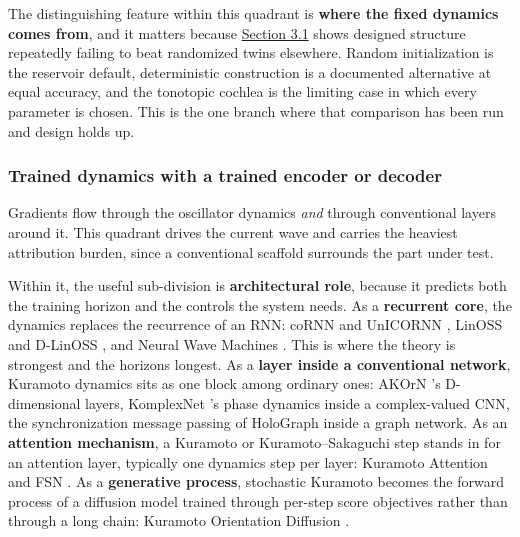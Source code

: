 \documentclass[10pt]{article}
\begin{document}
The distinguishing feature within this quadrant is \textbf{where the
fixed dynamics comes from}, and it matters because
\hyperref[sec-3-1]{Section 3.1} shows designed structure repeatedly
failing to beat randomized twins elsewhere. Random initialization is the
reservoir default, deterministic construction is a documented
alternative at equal accuracy, and the tonotopic cochlea is the limiting
case in which every parameter is chosen. This is the one branch where
that comparison has been run and design holds up.

\subsubsection{Trained dynamics with a trained encoder or
decoder}\label{sec-2-2-5}

Gradients flow through the oscillator dynamics \emph{and} through
conventional layers around it. This quadrant drives the current wave and
carries the heaviest attribution burden, since a conventional scaffold
surrounds the part under test.

Within it, the useful sub-division is \textbf{architectural role},
because it predicts both the training horizon and the controls the
system needs. As a \textbf{recurrent core}, the dynamics replaces the
recurrence of an RNN: coRNN \citep{rusch2021} and UnICORNN
\citep{unicornn}, LinOSS \citep{rusch2025} and D-LinOSS
\citep{d-linoss}, and Neural Wave Machines \citep{keller2023}. This is
where the theory is strongest and the horizons longest. As a
\textbf{layer inside a conventional network}, Kuramoto dynamics sits as
one block among ordinary ones: AKOrN \citep{akorn}'s D-dimensional
layers, KomplexNet \citep{muzellec2025}'s phase dynamics inside a
complex-valued CNN, the synchronization message passing of HoloGraph
\citep{dan2025} inside a graph network. As an \textbf{attention
mechanism}, a Kuramoto or Kuramoto--Sakaguchi step stands in for an
attention layer, typically one dynamics step per layer: Kuramoto
Attention \citep{kuramoto-attention} and FSN \citep{nunley2026}. As a
\textbf{generative process}, stochastic Kuramoto becomes the forward
process of a diffusion model trained through per-step score objectives
rather than through a long chain: Kuramoto Orientation Diffusion
\citep{kuramoto-orientation-diffusion}.
\end{document}
